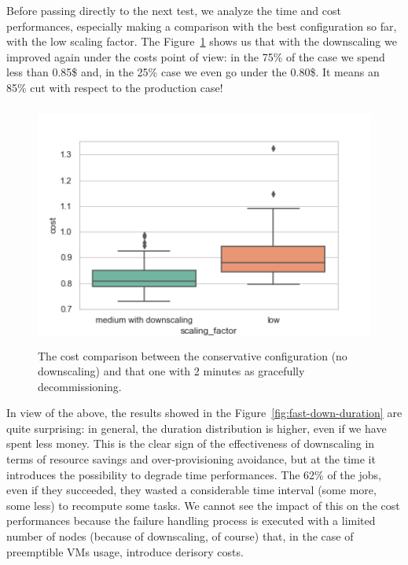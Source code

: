 \documentclass[12pt,twoside,cucitura]{toptesi}
\begin{document}
Before passing directly to the next test, we analyze the time and cost performances, especially making a comparison with the best configuration so far, with the low scaling factor. The Figure~\ref{fig:fast-down-cost} shows us that with the downscaling we improved again under the costs point of view: in the 75\% of the case we spend less than 0.85\$ and, in the 25\% case we even go under the 0.80\$. It means an 85\% cut with respect to the production case!

\begin{figure}
\centering
\includegraphics[height=80mm]{fast-down-cost}
\caption{The cost comparison between the conservative configuration (no downscaling) and that one with 2 minutes as gracefully decommissioning.}\label{fig:fast-down-cost}
\end{figure}

In view of the above, the results showed in the Figure~\ref{fig:fast-down-duration} are quite surprising: in general, the duration distribution is higher, even if we have spent less money. This is the clear sign of the effectiveness of downscaling in terms of resource savings and over-provisioning avoidance, but at the time it introduces the possibility to degrade time performances. The 62\% of the jobs, even if they succeeded, they wasted a considerable time interval (some more, some less) to recompute some tasks. We cannot see the impact of this on the cost performances because the failure handling process is executed with a limited number of nodes (because of downscaling, of course) that, in the case of preemptible VMs usage, introduce derisory costs. 
\end{document}
